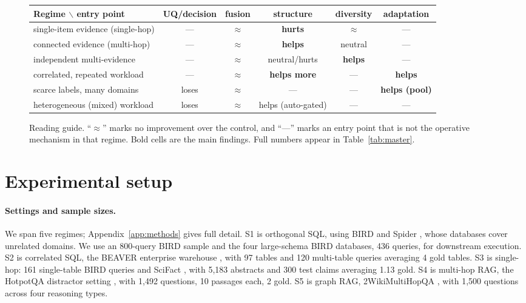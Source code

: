 \documentclass[11pt]{article}
\begin{document}
\begin{figure}[t]
\centering\small
\renewcommand{\arraystretch}{1.25}
\begin{tabular}{@{}l|ccccc@{}}
\toprule
\textbf{Regime} $\backslash$ \textbf{entry point} & UQ/decision & fusion & structure & diversity & adaptation\\
\midrule
single-item evidence (single-hop)      & ---      & $\approx$ & \textbf{hurts}      & $\approx$            & ---\\
connected evidence (multi-hop)         & ---      & $\approx$ & \textbf{helps}      & neutral             & ---\\
independent multi-evidence             & ---      & $\approx$ & neutral/hurts       & \textbf{helps}      & ---\\
correlated, repeated workload          & ---      & $\approx$ & \textbf{helps more} & ---                 & \textbf{helps}\\
scarce labels, many domains            & loses    & $\approx$ & ---                 & ---                 & \textbf{helps (pool)}\\
heterogeneous (mixed) workload         & loses    & $\approx$ & helps (auto-gated)  & ---                 & ---\\
\bottomrule
\end{tabular}
\caption{Reading guide. ``$\approx$'' marks no improvement over the control, and ``---'' marks an entry
point that is not the operative mechanism in that regime. Bold cells are the main findings. Full numbers
appear in Table~\ref{tab:master}.}
\label{fig:matrix}
\end{figure}

\section{Experimental setup}\label{sec:setup}

\paragraph{Settings and sample sizes.} We span five regimes; Appendix~\ref{app:methods} gives full
detail. S1 is orthogonal SQL, using BIRD \citep{li2023bird} and Spider \citep{yu2018spider}, whose
databases cover unrelated domains. We use an 800-query BIRD sample and the four large-schema BIRD
databases, 436 queries, for downstream execution. S2 is correlated SQL, the BEAVER enterprise warehouse
\citep{chen2024beaver}, with 97 tables and 120 multi-table queries averaging 4 gold tables. S3 is
single-hop: 161 single-table BIRD queries and SciFact \citep{wadden2020scifact}, with 5{,}183 abstracts
and 300 test claims averaging 1.13 gold. S4 is multi-hop RAG, the HotpotQA distractor setting
\citep{yang2018hotpotqa}, with 1{,}492 questions, 10 passages each, 2 gold. S5 is graph RAG,
2WikiMultiHopQA \citep{ho2020twowiki}, with 1{,}500 questions across four reasoning types.
\end{document}
